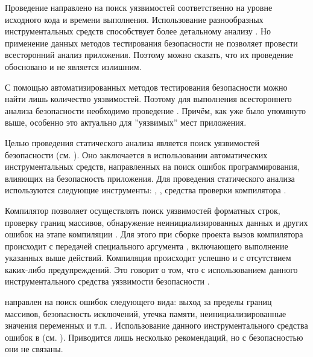 %
Проведение  направлено на поиск уязвимостей соответственно на уровне исходного кода и времени выполнения. 
%
Использование разнообразных инструментальных средств способствует более детальному анализу . 
%
Но применение данных методов тестирования безопасности не позволяет провести всесторонний анализ приложения. 
%
Поэтому можно сказать, что их проведение обосновано и не является излишним.

%
С помощью автоматизированных методов тестирования безопасности можно найти лишь  количество уязвимостей. 
%
Поэтому для выполнения всестороннего анализа безопасности  необходимо проведение . 
%
Причём, как уже было упомянуто выше, особенно это актуально для ''уязвимых'' мест приложения. 



%
Целью проведения статического анализа является поиск уязвимостей безопасности  (см. ). 
%
Оно заключается в использовании автоматических инструментальных средств, направленных на поиск ошибок программирования, влияющих на безопасность приложения. 
%
Для проведения статического анализа  используются следующие инструменты: , , средства проверки компилятора . 

%
Компилятор  позволяет осуществлять поиск уязвимостей форматных строк, проверку границ массивов, обнаружение неинициализированных данных и других ошибок на этапе компиляции . 
%
Для этого при сборке проекта вызов компилятора происходит с передачей специального аргумента , включающего выполнение указанных выше действий. 
%
Компиляция  происходит успешно и с отсутствием каких-либо предупреждений. 
%
Это говорит о том, что с использованием данного инструментального средства уязвимости безопасности . 

%
 направлен на поиск ошибок следующего вида: выход за пределы границ массивов, безопасность исключений, утечка памяти, неинициализированные значения переменных и т.п. . 
%
Использование данного инструментального средства ошибок в   (см. ). 
%
Приводится лишь несколько рекомендаций, но с безопасностью они не связаны. 

